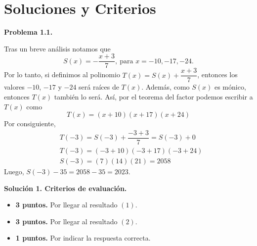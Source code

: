 \newpage
\section{\large Soluciones y Criterios}

\textbf{Problema 1.1.}
\begin{solution}[1]
    Tras un breve análisis notamos que
    \begin{equation}
        S(x) = - \frac{x + 3}{7},\ \text{para $x = -10, -17, -24$}.
    \end{equation}
    Por lo tanto, si definimos al polinomio $T(x) = S(x) + \dfrac{x + 3}{7}$, entonces los valores $-10$, $-17$ y $-24$ será raíces de $T(x)$.
    Además, como $S(x)$ es mónico, entonces $T(x)$ también lo será.
    Así, por el teorema del factor podemos escribir a $T(x)$ como
    \begin{equation}
        T(x) = (x + 10)(x + 17)(x + 24)
    \end{equation}
    Por consiguiente,
    \begin{align*}
        &T(-3) = S(-3) + \dfrac{-3 + 3}{7} = S(-3) + 0\\[2mm]
        &T(-3) = (-3 + 10)(-3 + 17)(-3 + 24)\\[2mm]
        &S(-3) = (7)(14)(21) = 2058
    \end{align*}
    Luego, $S(-3) - 35 = 2058 - 35 = \boxed{2023}$.
\end{solution}


\textbf{Solución 1. Criterios de evaluación.}
\begin{itemize}
    \item \textbf{3 puntos.} Por llegar al resultado $(1)$.
    \item \textbf{3 puntos.} Por llegar al resultado $(2)$.
    \item \textbf{1 puntos.} Por indicar la respuesta correcta.
\end{itemize}
\vspace{10mm}

